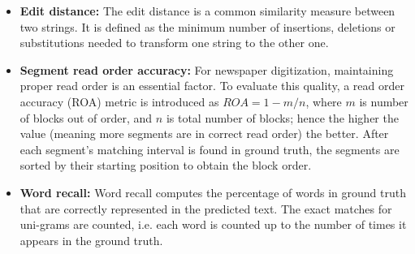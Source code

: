 \documentclass[letterpaper]{article} %
\begin{document}
\begin{itemize}
    \item \textbf{Edit distance:} The edit distance is a common similarity measure between two strings. It is defined as the minimum number of insertions, deletions or substitutions needed to transform one string to the other one.
    \item \textbf{Segment read order accuracy:} For newspaper digitization, maintaining proper read order is an essential factor. To evaluate this quality, a read order accuracy (ROA) metric is introduced as $ROA = 1 - m / n$, where $m$ is number of blocks out of order, and $n$ is total number of blocks; hence the higher the value (meaning more segments are in correct read order) the better. After each segment's matching interval is found in ground truth, the segments are sorted by their starting position to obtain the block order.
    \item \textbf{Word recall:} Word recall computes the percentage of words in ground truth that are correctly represented in the predicted text. The exact matches for uni-grams are counted, i.e.  each word is counted up to the number of times it appears in the ground truth. 
\end{itemize}
\end{document}
